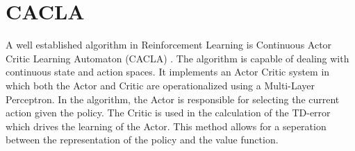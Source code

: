 
\section{CACLA}
A well established algorithm in Reinforcement Learning is Continuous Actor Critic Learning Automaton (CACLA) \cite{van2007reinforcement}. The algorithm is capable of dealing with continuous state and action spaces. It implements an Actor Critic system in which both the Actor and Critic are operationalized using a Multi-Layer Perceptron. In the algorithm, the Actor is responsible for selecting the current action given the policy. The Critic is used in the calculation of the TD-error which drives the learning of the Actor. This method allows for a seperation between the representation of the policy and the value function. 


